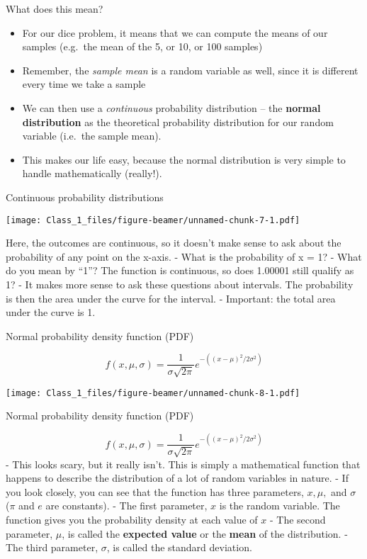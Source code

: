 \begin{frame}{What does this mean?}

\begin{itemize}
\itemsep1pt\parskip0pt
\item
  For our dice problem, it means that we can compute the means of our
  samples (e.g.~the mean of the 5, or 10, or 100 samples)
\item
  Remember, the \emph{sample mean} is a random variable as well, since
  it is different every time we take a sample
\item
  We can then use a \emph{continuous} probability distribution -- the
  \textbf{normal distribution} as the theoretical probability
  distribution for our random variable (i.e.~the sample mean).
\item
  This makes our life easy, because the normal distribution is very
  simple to handle mathematically (really!).
\end{itemize}

\end{frame}

\begin{frame}{Continuous probability distributions}

\texttt{[image: Class\_1\_files/figure-beamer/unnamed-chunk-7-1.pdf]}

Here, the outcomes are continuous, so it doesn't make sense to ask about
the probability of any point on the x-axis. - What is the probability of
x = 1? - What do you mean by ``1''? The function is continuous, so does
1.00001 still qualify as 1? - It makes more sense to ask these questions
about intervals. The probability is then the area under the curve for
the interval. - Important: the total area under the curve is 1.

\end{frame}

\begin{frame}{Normal probability density function (PDF)}

\[
  f(x,\mu,\sigma) = \frac{1}{\sigma \sqrt{2 \pi}} e^{-((x - \mu)^2/2 \sigma^2)}
\]

\texttt{[image: Class\_1\_files/figure-beamer/unnamed-chunk-8-1.pdf]}

\end{frame}

\begin{frame}{Normal probability density function (PDF)}

\[
  f(x,\mu,\sigma) = \frac{1}{\sigma \sqrt{2 \pi}} e^{-((x - \mu)^2/2 \sigma^2)}
\] - This looks scary, but it really isn't. This is simply a
mathematical function that happens to describe the distribution of a lot
of random variables in nature. - If you look closely, you can see that
the function has three parameters, \(x, \mu,\) and \(\sigma\) (\(\pi\)
and \(e\) are constants). - The first parameter, \(x\) is the random
variable. The function gives you the probability density at each value
of \(x\) - The second parameter, \(\mu\), is called the \textbf{expected
value} or the \textbf{mean} of the distribution. - The third parameter,
\(\sigma\), is called the standard deviation.

\end{frame}

